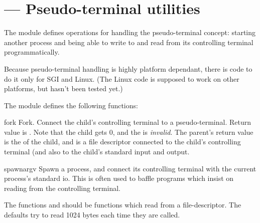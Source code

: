 
\section{ ---
         Pseudo-terminal utilities}


The  module defines operations for handling the
pseudo-terminal concept: starting another process and being able to
write to and read from its controlling terminal programmatically.

Because pseudo-terminal handling is highly platform dependant, there
is code to do it only for SGI and Linux. (The Linux code is supposed
to work on other platforms, but hasn't been tested yet.)

The  module defines the following functions:

\begin{funcdesc}{fork}{}
Fork. Connect the child's controlling terminal to a pseudo-terminal.
Return value is . Note that the child 
gets  0, and the  is \emph{invalid}. The parent's
return value is the  of the child, and  is a file
descriptor connected to the child's controlling terminal (and also
to the child's standard input and output.
\end{funcdesc}

\begin{funcdesc}{spawn}{argv}
Spawn a process, and connect its controlling terminal with the current 
process's standard io. This is often used to baffle programs which
insist on reading from the controlling terminal.

The functions  and  should be
functions which read from a file-descriptor. The defaults try to read
1024 bytes each time they are called.
\end{funcdesc}
